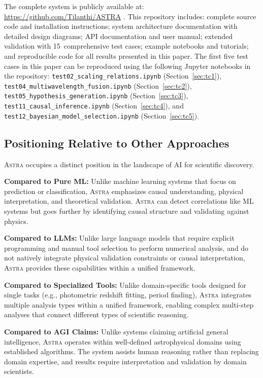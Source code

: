 \documentclass[usenatbib]{rasti}
\newcommand{\astra}{\textsc{Astra}\xspace}
\begin{document}
The complete system is publicly available at: \url{https://github.com/Tilanthi/ASTRA} \citep{White2026}.
This repository includes: complete source code and installation instructions; system architecture documentation with detailed design diagrams; API documentation and user manual; extended validation with 15~comprehensive test cases; example notebooks and tutorials; and reproducible code for all results presented in this paper.
The first five test cases in this paper can be reproduced using the following Jupyter notebooks in the repository:
\texttt{test02\_scaling\_relations.ipynb} (Section~\ref{sec:tc1}),
\texttt{test04\_multiwavelength\_fusion.ipynb} (Section~\ref{sec:tc2}),
\texttt{test05\_hypothesis\_generation.ipynb} (Section~\ref{sec:tc3}),
\texttt{test11\_causal\_inference.ipynb} (Section~\ref{sec:tc4}), and
\texttt{test12\_bayesian\_model\_selection.ipynb} (Section~\ref{sec:tc5}).

\subsection{Positioning Relative to Other Approaches}
\label{sec:methods:positioning}

\astra occupies a distinct position in the landscape of AI for scientific discovery.

\textbf{Compared to Pure ML:}
Unlike machine learning systems that focus on prediction or classification, \astra emphasizes causal understanding, physical interpretation, and theoretical validation.
\astra can detect correlations like ML systems but goes further by identifying causal structure and validating against physics.

\textbf{Compared to LLMs:}
Unlike large language models that require explicit programming and manual tool selection to perform numerical analysis, and do not natively integrate physical validation constraints or causal interpretation, \astra provides these capabilities within a unified framework.

\textbf{Compared to Specialized Tools:}
Unlike domain-specific tools designed for single tasks (e.g., photometric redshift fitting, period finding), \astra integrates multiple analysis types within a unified framework, enabling complex multi-step analyses that connect different types of scientific reasoning.

\textbf{Compared to AGI Claims:}
Unlike systems claiming artificial general intelligence, \astra operates within well-defined astrophysical domains using established algorithms.
The system assists human reasoning rather than replacing domain expertise, and results require interpretation and validation by domain scientists.
\end{document}
